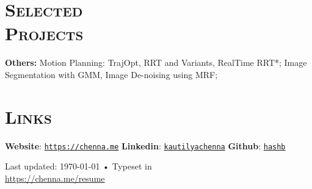 \documentclass[margin, line]{resume}
\begin{document}
\begin{resume}
	\sectionline
	\section{\mysidestyle \textsc{Selected \\ Projects}}

	\textbf{Others:} Motion Planning: TrajOpt, RRT and Variants, RealTime RRT*; Image Segmentation with GMM, Image De-noising using MRF; 
	
	
%	
%	


	
	\sectionline
    \section{\mysidestyle \textsc{Links}}
	\textbf{Website}: \texttt{\href{https://chenna.me}{https://chenna.me}} \hspace{2mm}%
    \textbf{Linkedin}: \texttt{\href{https://www.linkedin.com/in/kautilyachenna/}{kautilyachenna}} \hspace{2mm}%
    \textbf{Github}: \texttt{\href{https://github.com/hashb}{hashb}}
    \vspace{-3.2mm}

\begin{center}
	{\scriptsize  Last updated: \today\- •\- Typeset in {\XeTeX }\\
		\href{https://chenna.me/resume}{https://chenna.me/resume}}
\end{center}

\end{resume}
\end{document}
